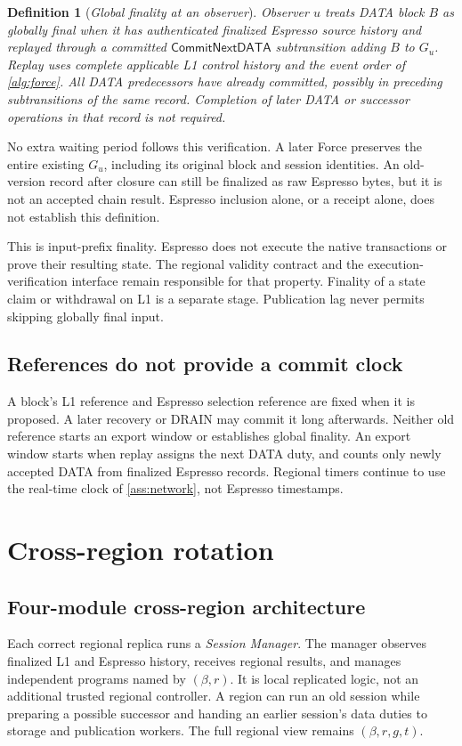 \documentclass[11pt,a4paper]{article}
\newcommand{\tagg}[1]{\ensuremath{\mathsf{#1}}}
\newcommand{\defterm}[1]{\textcolor{rrBlue}{\textit{#1}}}
\newtheorem{definition}{Definition}[section]
\newcounter{protocol}
\begin{document}
\begin{definition}[\defterm{Global finality at an observer}]
\label{def:global-finality}
Observer $u$ treats DATA block $B$ as globally final when it has
authenticated finalized Espresso source history and replayed through a
committed $\tagg{CommitNextDATA}$ subtransition adding $B$ to $G_u$.
Replay uses complete applicable L1 control history and the event order
of \cref{alg:force}. All DATA predecessors have already committed,
possibly in preceding subtransitions of the same record. Completion of
later DATA or successor operations in that record is not required.
\end{definition}

No extra waiting period follows this verification. A later Force
preserves the entire existing $G_u$, including its original block and
session identities. An old-version record after closure can still be
finalized as raw Espresso bytes, but it is not an accepted chain result.
Espresso inclusion alone, or a receipt alone, does not establish this
definition.

This is input-prefix finality. Espresso does not execute the native
transactions or prove their resulting state. The regional validity
contract and the execution-verification interface remain responsible
for that property. Finality of a state claim or withdrawal on L1 is a
separate stage. Publication lag never permits skipping globally final
input.

\subsection{References do not provide a commit clock}
\label{sec:late-receipt}
A block's L1 reference and Espresso selection reference are fixed when
it is proposed. A later recovery or DRAIN may commit it long afterwards.
Neither old reference starts an export window or establishes global
finality. An export window starts when replay assigns the next DATA
duty, and counts only newly accepted DATA from finalized Espresso
records. Regional timers continue to use the real-time clock of
\cref{ass:network}, not Espresso timestamps.

\section{Cross-region rotation}
\label{sec:xprotocols}

\subsection{Four-module cross-region architecture}
\label{sec:runtime-modules}
Each correct regional replica runs a \defterm{Session Manager}. The
manager observes finalized L1 and Espresso history, receives regional
results, and manages independent programs named by $(\beta,r)$.
It is local replicated logic, not an additional trusted regional
controller. A region can run an old session while preparing a possible
successor and handing an earlier session's data duties to storage and
publication workers. The full regional view remains $(\beta,r,g,t)$.
\end{document}
